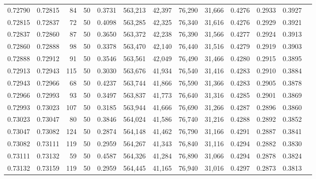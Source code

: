 \begin{tabular}{rrrrrrrrrrrrr}
0.72790 & 0.72815 &    84 &  50 &                                     0.3731 & 563,213 &  42,397 &  76,290 &  31,666 & 0.4276 & 0.2933 & 0.3927 \\
0.72815 & 0.72837 &    72 &  50 &                                     0.4098 & 563,285 &  42,325 &  76,340 &  31,616 & 0.4276 & 0.2929 & 0.3921 \\
0.72837 & 0.72860 &    87 &  50 &                                     0.3650 & 563,372 &  42,238 &  76,390 &  31,566 & 0.4277 & 0.2924 & 0.3913 \\
0.72860 & 0.72888 &    98 &  50 &                                     0.3378 & 563,470 &  42,140 &  76,440 &  31,516 & 0.4279 & 0.2919 & 0.3903 \\
0.72888 & 0.72912 &    91 &  50 &                                     0.3546 & 563,561 &  42,049 &  76,490 &  31,466 & 0.4280 & 0.2915 & 0.3895 \\
0.72913 & 0.72943 &   115 &  50 &                                     0.3030 & 563,676 &  41,934 &  76,540 &  31,416 & 0.4283 & 0.2910 & 0.3884 \\
0.72943 & 0.72966 &    68 &  50 &                                     0.4237 & 563,744 &  41,866 &  76,590 &  31,366 & 0.4283 & 0.2905 & 0.3878 \\
0.72966 & 0.72993 &    93 &  50 &                                     0.3497 & 563,837 &  41,773 &  76,640 &  31,316 & 0.4285 & 0.2901 & 0.3869 \\
0.72993 & 0.73023 &   107 &  50 &                                     0.3185 & 563,944 &  41,666 &  76,690 &  31,266 & 0.4287 & 0.2896 & 0.3860 \\
0.73023 & 0.73047 &    80 &  50 &                                     0.3846 & 564,024 &  41,586 &  76,740 &  31,216 & 0.4288 & 0.2892 & 0.3852 \\
0.73047 & 0.73082 &   124 &  50 &                                     0.2874 & 564,148 &  41,462 &  76,790 &  31,166 & 0.4291 & 0.2887 & 0.3841 \\
0.73082 & 0.73111 &   119 &  50 &                                     0.2959 & 564,267 &  41,343 &  76,840 &  31,116 & 0.4294 & 0.2882 & 0.3830 \\
0.73111 & 0.73132 &    59 &  50 &                                     0.4587 & 564,326 &  41,284 &  76,890 &  31,066 & 0.4294 & 0.2878 & 0.3824 \\
0.73132 & 0.73159 &   119 &  50 &                                     0.2959 & 564,445 &  41,165 &  76,940 &  31,016 & 0.4297 & 0.2873 & 0.3813 \\

\end{tabular}

